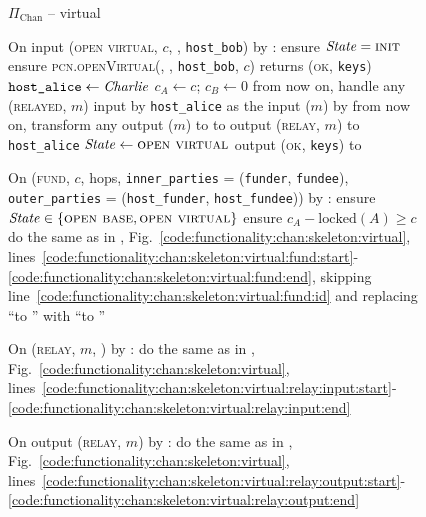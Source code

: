 \begin{figure}[H]
  \begin{protocolbox}{$\Pi_{\mathrm{Chan}}$ -- virtual}
    \begin{algorithmic}[1]
      \State {}
      \State {}
      \State On input (\textsc{open virtual}, $c$, \bob, \texttt{host\_bob}) by
      \charlie:
      \label{code:protocol:chan:skeleton:vchan:open-virtual}
      \Indent
        \State ensure $\mathit{State} = \textsc{init}$
        \State ensure \textsc{pcn.openVirtual}(\bob, \charlie,
        \texttt{host\_bob}, $c$) returns (\textsc{ok}, \texttt{keys})
        \label{code:protocol:chan:skeleton:vchan:ln}
        \State $\texttt{host\_alice} \gets \mathit{Charlie}$
        \State $c_A \gets c$; $c_B \gets 0$
        \State from now on, handle any (\textsc{relayed}, $m$) input by
        \texttt{host\_alice} as the input ($m$) by \environment
        \State from now on, transform any output ($m$) to \environment to
        output (\textsc{relay}, $m$) to \texttt{host\_alice}
        \State $\mathit{State} \gets \textsc{open virtual}$
        \State output (\textsc{ok}, \texttt{keys}) to \charlie
        \label{code:protocol:chan:skeleton:vchan:open-virtual:output}
      \EndIndent
      \Statex

      \State On (\textsc{fund}, $c$, hops, \texttt{inner\_parties} =
      (\texttt{funder}, \texttt{fundee}), \texttt{outer\_parties} =
      (\texttt{host\_funder}, \texttt{host\_fundee})) by \environment:
      \Indent
        \State ensure $\mathit{State} \in \{\textsc{open base}, \textsc{open
        virtual}\}$
        \State ensure $c_A - \mathrm{locked}(A) \geq c$
        \State do the same as in \fchan,
        Fig.~\ref{code:functionality:chan:skeleton:virtual},
        lines~\ref{code:functionality:chan:skeleton:virtual:fund:start}-\ref{code:functionality:chan:skeleton:virtual:fund:end},
        skipping line~\ref{code:functionality:chan:skeleton:virtual:fund:id} and
        replacing ``to \alice'' with ``to \environment''
        \label{code:protocol:chan:skeleton:vchan}
      \EndIndent
      \Statex

      \State On (\textsc{relay}, $m$, \charlie) by \environment:
      \Indent
        \State do the same as in \fchan,
        Fig.~\ref{code:functionality:chan:skeleton:virtual},
        lines~\ref{code:functionality:chan:skeleton:virtual:relay:input:start}-\ref{code:functionality:chan:skeleton:virtual:relay:input:end}
      \EndIndent
      \Statex

      \State On output (\textsc{relay}, $m$) by \charlie:
      \Indent
        \State do the same as in \fchan,
        Fig.~\ref{code:functionality:chan:skeleton:virtual},
        lines~\ref{code:functionality:chan:skeleton:virtual:relay:output:start}-\ref{code:functionality:chan:skeleton:virtual:relay:output:end}
      \EndIndent
    \end{algorithmic}
  \end{protocolbox}
  \caption{}
  \label{code:protocol:chan:skeleton:virtual}
\end{figure}
